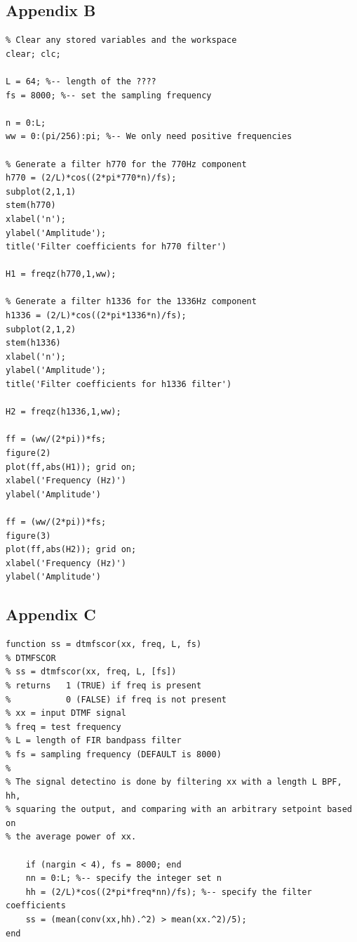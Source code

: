 \documentclass{article}
\begin{document}
\newpage

\subsection{Appendix B}

\begin{lstlisting}
% Clear any stored variables and the workspace
clear; clc;

L = 64; %-- length of the ????
fs = 8000; %-- set the sampling frequency

n = 0:L;
ww = 0:(pi/256):pi; %-- We only need positive frequencies

% Generate a filter h770 for the 770Hz component
h770 = (2/L)*cos((2*pi*770*n)/fs);
subplot(2,1,1)
stem(h770)
xlabel('n');
ylabel('Amplitude');
title('Filter coefficients for h770 filter')

H1 = freqz(h770,1,ww);

% Generate a filter h1336 for the 1336Hz component
h1336 = (2/L)*cos((2*pi*1336*n)/fs);
subplot(2,1,2)
stem(h1336)
xlabel('n');
ylabel('Amplitude');
title('Filter coefficients for h1336 filter')

H2 = freqz(h1336,1,ww);

ff = (ww/(2*pi))*fs;
figure(2)
plot(ff,abs(H1)); grid on;
xlabel('Frequency (Hz)')
ylabel('Amplitude')

ff = (ww/(2*pi))*fs;
figure(3)
plot(ff,abs(H2)); grid on;
xlabel('Frequency (Hz)')
ylabel('Amplitude')
\end{lstlisting}

\newpage

\subsection{Appendix C}

\begin{lstlisting}
function ss = dtmfscor(xx, freq, L, fs)
% DTMFSCOR
% ss = dtmfscor(xx, freq, L, [fs])
% returns   1 (TRUE) if freq is present
%           0 (FALSE) if freq is not present
% xx = input DTMF signal
% freq = test frequency
% L = length of FIR bandpass filter
% fs = sampling frequency (DEFAULT is 8000)
%
% The signal detectino is done by filtering xx with a length L BPF, hh,
% squaring the output, and comparing with an arbitrary setpoint based on
% the average power of xx.

	if (nargin < 4), fs = 8000; end
	nn = 0:L; %-- specify the integer set n
	hh = (2/L)*cos((2*pi*freq*nn)/fs); %-- specify the filter coefficients 
	ss = (mean(conv(xx,hh).^2) > mean(xx.^2)/5);
end
\end{lstlisting}
\end{document}
